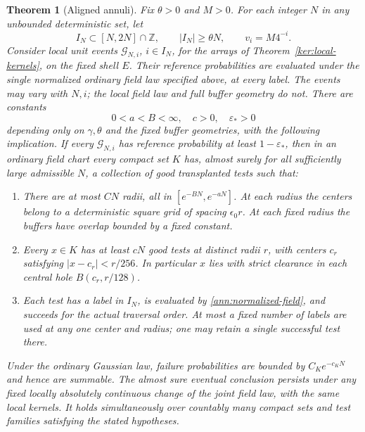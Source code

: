 \documentclass[11pt]{article}
\numberwithin{equation}{section}
\newtheorem{theorem}{Theorem}[section]
\theoremstyle{definition}
\theoremstyle{remark}
\newcommand{\Z}{\mathbb Z}
\newcommand{\1}{\mathbf 1}
\begin{document}
\begin{theorem}[Aligned annuli]\label{ann:aligned-annuli}
Fix \(\theta>0\) and \(M>0\).  For each integer \(N\) in any
unbounded deterministic set, let
\[
 I_N\subset[N,2N]\cap\Z,\qquad |I_N|\ge\theta N,\qquad
 v_i=M4^{-i}.
\]
Consider local unit events \(\mathcal G_{N,i}\), \(i\in I_N\),
for the arrays of Theorem~\ref{ker:local-kernels}, on the fixed
shell \(E\). Their reference probabilities are evaluated under the
single normalized ordinary field law specified above, at every label.
The events may vary with \(N,i\); the local field law and full
buffer geometry do not.  There are constants
\[
 0<a<B<\infty,\quad c>0,\quad \varepsilon_*>0
\]
depending only on \(\gamma,\theta\) and the fixed buffer geometries,
with the following implication.  If every \(\mathcal G_{N,i}\)
has reference probability at least \(1-\varepsilon_*\), then in
an ordinary field chart every compact set \(K\) has, almost surely
for all sufficiently large admissible \(N\), a collection of good
transplanted tests such that:
\begin{enumerate}
\item There are at most \(CN\) radii, all in
      \([e^{-BN},e^{-aN}]\).  At each radius the centers belong
      to a deterministic square grid of spacing
      \(\epsilon_0r\). At each fixed radius the buffers have overlap
      bounded by a fixed constant.
\item Every \(x\in K\) has at least \(cN\) good tests at
      distinct radii \(r\), with centers \(c_r\) satisfying
      \(|x-c_r|<r/256\).  In particular \(x\) lies with strict
      clearance in each central hole \(B(c_r,r/128)\).
\item Each test has a label in \(I_N\), is evaluated by
      \eqref{ann:normalized-field}, and succeeds for the actual
      traversal order.  At most a fixed number of labels are
      used at any one center and radius; one may retain a single
      successful test there.
\end{enumerate}
Under the ordinary Gaussian law, failure probabilities are bounded
by \(C_Ke^{-c_KN}\) and hence are summable.  The almost sure
eventual conclusion persists under any fixed locally absolutely
continuous change of the joint field law, with the same local
kernels.  It holds simultaneously over countably many compact
sets and test families satisfying the stated hypotheses.
\end{theorem}
\end{document}

